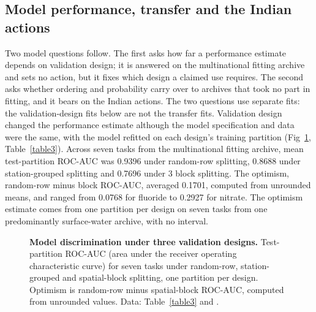 \documentclass[10pt,letterpaper]{article}
\begin{document}
\subsection*{Model performance, transfer and the Indian actions}

Two model questions follow. The first asks how far a performance estimate depends on validation design; it is answered on the multinational fitting archive and sets no action, but it fixes which design a claimed use requires. The second asks whether ordering and probability carry over to archives that took no part in fitting, and it bears on the Indian actions. The two questions use separate fits: the validation-design fits below are not the transfer fits. Validation design changed the performance estimate although the model specification and data were the same, with the model refitted on each design's training partition (Fig~\ref{fig:design-discrimination}, Table~\ref{table3}). Across seven tasks from the multinational fitting archive, mean test-partition ROC-AUC was 0.9396 under random-row splitting, 0.8688 under station-grouped splitting and 0.7696 under 3\textdegree{} block splitting. The optimism, random-row minus block ROC-AUC, averaged 0.1701, computed from unrounded means, and ranged from 0.0768 for fluoride to 0.2927 for nitrate. The optimism estimate comes from one partition per design on seven tasks from one predominantly surface-water archive, with no interval.\label{callout:fig:design-discrimination}\label{callout:table3}

\begin{figure}[!ht]
\caption{\textbf{Model discrimination under three validation designs.} Test-partition ROC-AUC (area under the receiver operating characteristic curve) for seven tasks under random-row, station-grouped and spatial-block splitting, one partition per design. Optimism is random-row minus spatial-block ROC-AUC, computed from unrounded values. Data: Table~\ref{table3} and .}
\label{fig:design-discrimination}
\end{figure}
\end{document}
